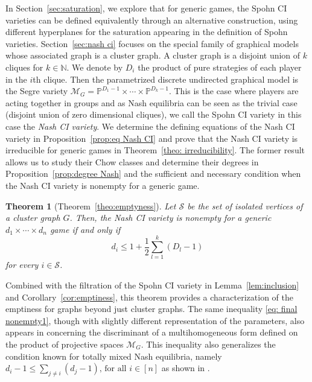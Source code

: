 \documentclass[11pt]{amsart}
\numberwithin{equation}{section}
\theoremstyle{plain}
\newtheorem{theorem}{Theorem}
\numberwithin{theorem}{section}
\theoremstyle{definition}
\newcommand{\PP}{{\mathbb P}}
\newcommand{\Mg}{{\mathcal M}_G}
\begin{document}
In Section~\ref{sec:saturation}, we explore that for generic games, the Spohn CI varieties can be defined equivalently through an alternative construction, using different hyperplanes for the saturation appearing in the definition of Spohn varieties. Section~\ref{sec:nash ci} focuses on the special family of graphical models whose associated graph is a cluster graph. A cluster graph is a disjoint union of $k$ cliques for $k\in\mathbb{N}$. We denote by $D_i$ the product of pure strategies of each player in the $i$th clique. Then the parametrized discrete undirected graphical model is the Segre variety $\Mg=\PP^{D_1-1}\times\cdots\times\PP^{D_k-1}$. This is the case where players are acting together in groups and as Nash equilibria can be seen as the trivial case (disjoint union of zero dimensional cliques), we call the Spohn CI variety in this case the \textit{Nash CI variety}. We determine the defining equations of the Nash CI variety in Proposition~\ref{prop:eq Nash CI} and prove that the Nash CI variety is irreducible for generic games in Theorem~\ref{theo: irreducibility}. The former result allows us to study their Chow classes and determine their degrees in Proposition~\ref{prop:degree Nash} and the sufficient and necessary condition when the Nash CI variety is nonempty for a generic game.
\begin{theorem}[Theorem~\ref{theo:emptyness}]\label{theorem 1.2}
    Let $\mathcal S$ be the set of isolated vertices of a cluster graph $G$. Then, the Nash CI variety is nonempty for a generic $d_1 \times \cdots \times d_n$ game if and only if
    \begin{equation}\label{eq: final nonempty1}
    d_i\leq1+\frac12 \sum_{l=1}^k(D_l-1)
    \end{equation}
    for every $i\in\mathcal S$.
\end{theorem}
Combined with the filtration of the Spohn CI variety in Lemma~\ref{lem:inclusion} and Corollary~\ref{cor:emptiness}, this theorem provides a characterization of the emptiness for graphs beyond just cluster graphs. The same inequality \eqref{eq: final nonempty1}, though with slightly different representation of the parameters, also appears in \cite[Proposition 2.3, Chapter 13]{Gelfand1994} concerning the discriminant of a multihomogeneous form defined on the product of projective spaces $\Mg$. This inequality also generalizes the condition known for totally mixed Nash equilibria, namely $d_i -1 \leq \sum_{j \neq i} (d_j -1)\text{, for all } i \in [n]$
as shown in \cite[Theorem 2.7]{abo2025vector}.
\\
\end{document}
